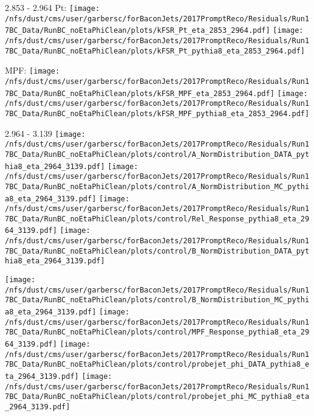 \documentclass[t,compress]{beamer}
\begin{document}
\begin{frame}{2.853 - 2.964}
	 Pt: \texttt{[image: /nfs/dust/cms/user/garbersc/forBaconJets/2017PromptReco/Residuals/Run17BC\_Data/RunBC\_noEtaPhiClean/plots/kFSR\_Pt\_eta\_2853\_2964.pdf]}
	\texttt{[image: /nfs/dust/cms/user/garbersc/forBaconJets/2017PromptReco/Residuals/Run17BC\_Data/RunBC\_noEtaPhiClean/plots/kFSR\_Pt\_pythia8\_eta\_2853\_2964.pdf]}
\newline

	 MPF: \texttt{[image: /nfs/dust/cms/user/garbersc/forBaconJets/2017PromptReco/Residuals/Run17BC\_Data/RunBC\_noEtaPhiClean/plots/kFSR\_MPF\_eta\_2853\_2964.pdf]}
	\texttt{[image: /nfs/dust/cms/user/garbersc/forBaconJets/2017PromptReco/Residuals/Run17BC\_Data/RunBC\_noEtaPhiClean/plots/kFSR\_MPF\_pythia8\_eta\_2853\_2964.pdf]}
\end{frame}

\begin{frame}{2.964 - 3.139}
	\texttt{[image: /nfs/dust/cms/user/garbersc/forBaconJets/2017PromptReco/Residuals/Run17BC\_Data/RunBC\_noEtaPhiClean/plots/control/A\_NormDistribution\_DATA\_pythia8\_eta\_2964\_3139.pdf]}
	\texttt{[image: /nfs/dust/cms/user/garbersc/forBaconJets/2017PromptReco/Residuals/Run17BC\_Data/RunBC\_noEtaPhiClean/plots/control/A\_NormDistribution\_MC\_pythia8\_eta\_2964\_3139.pdf]}
	\texttt{[image: /nfs/dust/cms/user/garbersc/forBaconJets/2017PromptReco/Residuals/Run17BC\_Data/RunBC\_noEtaPhiClean/plots/control/Rel\_Response\_pythia8\_eta\_2964\_3139.pdf]}
	\texttt{[image: /nfs/dust/cms/user/garbersc/forBaconJets/2017PromptReco/Residuals/Run17BC\_Data/RunBC\_noEtaPhiClean/plots/control/B\_NormDistribution\_DATA\_pythia8\_eta\_2964\_3139.pdf]}
\newline

	\texttt{[image: /nfs/dust/cms/user/garbersc/forBaconJets/2017PromptReco/Residuals/Run17BC\_Data/RunBC\_noEtaPhiClean/plots/control/B\_NormDistribution\_MC\_pythia8\_eta\_2964\_3139.pdf]}
	\texttt{[image: /nfs/dust/cms/user/garbersc/forBaconJets/2017PromptReco/Residuals/Run17BC\_Data/RunBC\_noEtaPhiClean/plots/control/MPF\_Response\_pythia8\_eta\_2964\_3139.pdf]}
	\texttt{[image: /nfs/dust/cms/user/garbersc/forBaconJets/2017PromptReco/Residuals/Run17BC\_Data/RunBC\_noEtaPhiClean/plots/control/probejet\_phi\_DATA\_pythia8\_eta\_2964\_3139.pdf]}
	\texttt{[image: /nfs/dust/cms/user/garbersc/forBaconJets/2017PromptReco/Residuals/Run17BC\_Data/RunBC\_noEtaPhiClean/plots/control/probejet\_phi\_MC\_pythia8\_eta\_2964\_3139.pdf]}
\end{frame}
\end{document}
